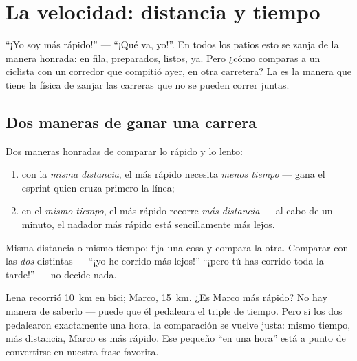 \chapter{La velocidad: distancia y tiempo}\label{ch:g5:speed-distance-time}

``¡Yo soy más rápido!'' --- ``¡Qué va, yo!''. En todos los patios esto
se zanja de la manera honrada: en fila, preparados, listos, ya. Pero
¿cómo comparas a un ciclista con un corredor que compitió ayer, en
otra carretera? La  es la manera que tiene la física de
zanjar las carreras que no se pueden correr juntas.

\section{Dos maneras de ganar una carrera}

\begin{proposition}\label{prop:g5:speed-distance-time:rules}
Dos maneras honradas de comparar lo rápido y lo lento:
\begin{enumerate}
  \item con la \emph{misma distancia}, el más rápido necesita
        \emph{menos tiempo} --- gana el esprint quien cruza primero la
        línea;
  \item en el \emph{mismo tiempo}, el más rápido recorre \emph{más
        distancia} --- al cabo de un minuto, el nadador más rápido
        está sencillamente más lejos.
\end{enumerate}
Misma distancia o mismo tiempo: fija una cosa y compara la otra.
Comparar con las \emph{dos} distintas --- ``¡yo he corrido más lejos!''
``¡pero tú has corrido toda la tarde!'' --- no decide nada.
\end{proposition}

\begin{example}\label{ex:g5:speed-distance-time:fair}
Lena recorrió \qty{10}{km} en bici; Marco, \qty{15}{km}. ¿Es Marco más
rápido? No hay manera de saberlo --- puede que él pedaleara el triple
de tiempo. Pero si los dos pedalearon exactamente una hora, la
comparación se vuelve justa: mismo tiempo, más distancia, Marco es más
rápido. Ese pequeño ``en una hora'' está a punto de convertirse en
nuestra frase favorita.
\end{example}

